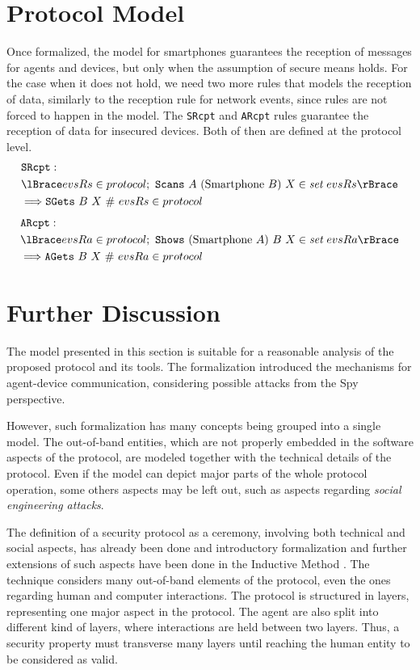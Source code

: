 \section{Protocol Model}
Once formalized, the model for smartphones guarantees the reception of messages for agents and devices, but only when the assumption of secure means holds. For the case when it does not hold, we need two more rules that models the reception of data, similarly to the reception rule for network events, since rules are not forced to happen in the model. The \texttt{SRcpt} and \texttt{ARcpt} rules guarantee the reception of data for insecured devices. Both of then are defined at the protocol level.
% 
\begin{align*}
  & \texttt{SRcpt}: \newline \\
  & \lBrace evsRs \in protocol;\ \texttt{Scans}\ A\ (\text{Smartphone}\ B)\ X \in \textit{set}\ evsRs \rBrace\\
  & \Longrightarrow \texttt{SGets}\ B\ X\ \#\ evsRs \in protocol
\end{align*}
%
\begin{align*}
  & \texttt{ARcpt}: \newline \\
  & \lBrace evsRa \in protocol;\ \texttt{Shows}\ (\text{Smartphone}\ A)\ B\ X \in \textit{set}\ evsRa \rBrace\\
  & \Longrightarrow \texttt{AGets}\ B\ X\ \#\ evsRa \in protocol
\end{align*}
%

\section{Further Discussion}
The model presented in this section is suitable for a reasonable analysis of the proposed protocol and its tools. The formalization introduced the mechanisms for agent-device communication, considering possible attacks from the Spy perspective. 

However, such formalization has many concepts being grouped into a single model. The out-of-band entities, which are not properly embedded in the software aspects of the protocol, are modeled together with the technical details of the protocol. Even if the model can depict major parts of the whole protocol operation, some others aspects may be left out, such as aspects regarding \textit{social engineering attacks}.

The definition of a security protocol as a ceremony, involving both technical and social aspects, has already been done \cite{Ellison07} and introductory formalization and further extensions of such aspects have been done in the Inductive Method \cite{Bella2012}. The technique considers many out-of-band elements of the protocol, even the ones regarding human and computer interactions. The protocol is structured in layers, representing one major aspect in the protocol. The agent are also split into different kind of layers, where interactions are held between two layers. Thus, a security property must transverse many layers until reaching the human entity to be considered as valid.

